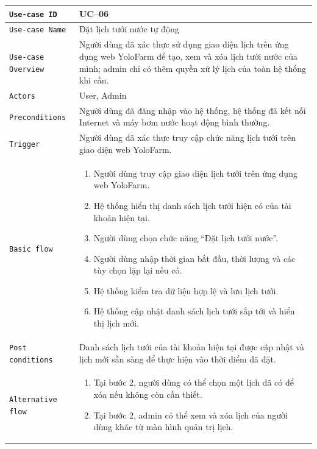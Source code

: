\begin{longtable}{|P{4.8cm}|m{10cm}|}\hline
	\texttt{Use-case ID} & UC--06\\
	\hline
	\texttt{Use-case Name} & Đặt lịch tưới nước tự động\\
	\hline
	\texttt{Use-case Overview} & Người dùng đã xác thực sử dụng giao diện lịch trên ứng dụng web YoloFarm để tạo, xem và xóa lịch tưới nước của mình; admin chỉ có thêm quyền xử lý lịch của toàn hệ thống khi cần.
	\\
	\hline
	\texttt{Actors} & User, Admin
	\\
	\hline
	\texttt{Preconditions} & Người dùng đã đăng nhập vào hệ thống, hệ thống đã kết nối Internet và máy bơm nước hoạt động bình thường.
	\\
	\hline
	\texttt{Trigger} & Người dùng đã xác thực truy cập chức năng lịch tưới trên giao diện web YoloFarm.\\
	\hline
	\texttt{Basic flow} &
	\begin{enumerate}
		\item Người dùng truy cập giao diện lịch tưới trên ứng dụng web YoloFarm.
		\item Hệ thống hiển thị danh sách lịch tưới hiện có của tài khoản hiện tại.
		\item Người dùng chọn chức năng ``Đặt lịch tưới nước''.
		\item Người dùng nhập thời gian bắt đầu, thời lượng và các tùy chọn lặp lại nếu có.
		\item Hệ thống kiểm tra dữ liệu hợp lệ và lưu lịch tưới.
		\item Hệ thống cập nhật danh sách lịch tưới sắp tới và hiển thị lịch mới.
	\end{enumerate}
	\\
	\hline
	\texttt{Post conditions} &
	Danh sách lịch tưới của tài khoản hiện tại được cập nhật và lịch mới sẵn sàng để thực hiện vào thời điểm đã đặt.
	\\
	\hline
	\texttt{Alternative flow} &
	\begin{enumerate}[label = A\arabic*:]
		\item Tại bước 2, người dùng có thể chọn một lịch đã có để xóa nếu không còn cần thiết.
		\item Tại bước 2, admin có thể xem và xóa lịch của người dùng khác từ màn hình quản trị lịch.
	\end{enumerate}

\end{longtable}
